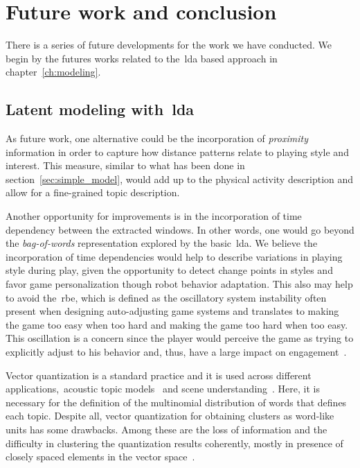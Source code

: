 \chapter{Future work and conclusion}\label{ch:future}

There is a series of future developments for the work we have conducted. We begin by the futures works related to the~\gls{lda} based approach in chapter~\ref{ch:modeling}.

\section{Latent modeling with~\gls{lda}}
As future work, one alternative could be the incorporation of \textit{proximity} information in order to capture how distance patterns relate to playing style and interest. This measure, similar to what has been done in section~\ref{sec:simple_model}, would add up to the physical activity description and allow for a fine-grained topic description.

Another opportunity for improvements is in the incorporation of time dependency between the extracted windows. In other words, one would go beyond the \textit{bag-of-words} representation explored by the basic~\gls{lda}. We believe the incorporation of time dependencies would help to describe variations in playing style during play, given the opportunity to detect change points in styles and favor game personalization though robot behavior adaptation. This also may help to avoid the~\gls{rbe}, which is defined as the oscillatory system instability often present when designing auto-adjusting game systems and translates to making the game too easy when too hard and making the game too hard when too easy. This oscillation is a concern since the player would perceive the game as trying to explicitly adjust to his behavior and, thus, have a large impact on engagement~\citep{martinoia_physically_2013}.

Vector quantization is a standard practice and it is used across different applications,~\eg acoustic topic models~\citep{kim_acoustic_2009,kim_audio_2009} and scene understanding~\citep{cao_spatially_2007,li_towards_2009,niu_context_2012}. Here, it is necessary for the definition of the multinomial distribution of words that defines each topic. Despite all, vector quantization for obtaining clusters as word-like units has some drawbacks. Among these are the loss of information and the difficulty in clustering the quantization results coherently, mostly in presence of closely spaced elements in the vector space~\citep{hu_latent_2012}.

